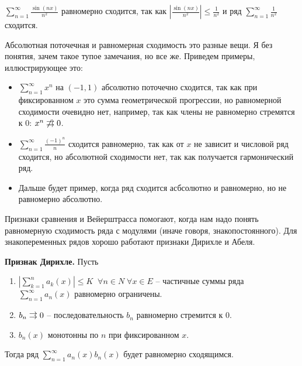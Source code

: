 \begin{example}
    $\sum\limits_{n = 1}^\infty \frac{\sin(nx)}{n^2}$ равномерно сходится, так как $\left| \frac{\sin(nx)}{n^2} \right| \leqslant \frac{1}{n^2}$ и ряд $\sum\limits_{n = 1}^\infty \frac{1}{n^2}$ сходится.
\end{example}

\vspace*{5mm}

\notice \; Абсолютная поточечная и равномерная сходимость это разные вещи.
Я без понятия, зачем такое тупое замечания, но все же. 
Приведем примеры, иллюстрирующее это: \begin{itemize}
    \item $\sum\limits_{n = 1}^\infty x^n$ на $(-1, 1)$ абсолютно поточечно сходится, так как при фиксированном $x$ это сумма геометрической прогрессии, но равномерной сходимости очевидно нет, например, так как члены не равномерно стремятся к 0: $x^n \not \doublerightarrow 0$.
    \item $\sum\limits_{n = 1}^\infty \frac{(-1)^n}{n}$ сходится равномерно, так как от $x$ не зависит и числовой ряд сходится, но абсолютной сходимости нет, так как получается гармонический ряд.
    \item Дальше будет пример, когда ряд сходится асбсолютно и равномерно, но не равномерно абсолютно.
\end{itemize}

\vspace*{5mm}

Признаки сравнения и Вейерштрасса помогают, когда нам надо понять равномерную сходимость ряда с модулями (иначе говоря, знакопостоянного).
Для знакопеременных рядов хорошо работают признаки Дирихле и Абеля.

\textbf{Признак Дирихле.} 
Пусть \begin{enumerate}
    \item $\left| \sum\limits_{k = 1}^n a_k(x) \right| \leqslant K \;\; \forall n \in N \; \forall x \in E$ -- частичные суммы ряда $\sum\limits_{n = 1}^\infty a_n(x)$ равномерно ограничены.
    \item $b_n \doublerightarrow 0$ -- последовательность $b_n$ равномерно стремится к 0.
    \item $b_n(x)$ монотонны по $n$ при фиксированном $x$.
\end{enumerate}
Тогда ряд $\sum\limits_{n = 1}^\infty a_n(x)b_n(x)$ будет равномерно сходящимся.


